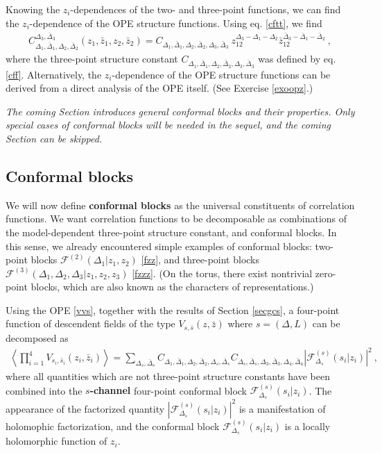 \documentclass[12pt,a4paper,notitlepage]{report}
\numberwithin{equation}{section}
\theoremstyle{break}
\begin{document}
Knowing the $z_i$-dependences of the two- and three-point functions, we can find the $z_i$-dependence of the OPE structure functions.
Using eq. \eqref{cftt}, we find 
\begin{align}
 \boxed{C_{\Delta_1,\bar{\Delta}_1,\Delta_2,\bar{\Delta}_2}^{\Delta_3,\bar{\Delta}_3}(z_1,\bar{z}_1,z_2,\bar{z}_2) = C_{\Delta_1,\bar{\Delta}_1,\Delta_2,\bar{\Delta}_2,\Delta_3,\bar{\Delta}_3}\ z_{12}^{\Delta_3-\Delta_1-\Delta_2}  \bar{z}_{12}^{\bar{\Delta}_3-\bar{\Delta}_1-\bar{\Delta}_2}}\ ,
\label{ccz}
\end{align}
where the three-point structure constant $C_{\Delta_1,\bar{\Delta}_1,\Delta_2,\bar{\Delta}_2,\Delta_3,\bar{\Delta}_3}$ was defined by eq. \eqref{cff}.
Alternatively, the $z_i$-dependence of the OPE structure functions can be derived from a direct analysis of the OPE itself. (See Exercise \ref{exoopz}.)

\vspace{2mm} 

\textit{The coming Section introduces general conformal blocks and their properties.
Only special cases of conformal blocks will be needed in the sequel, and the coming Section can be skipped.}

\subsection{Conformal blocks \label{secaco}}

We will now define \textbf{\boldmath conformal blocks} as the universal constituents of correlation functions. 
We want correlation functions to be decomposable as combinations of the model-dependent three-point structure constant, and conformal blocks.
In this sense, we already encountered simple examples of conformal blocks: two-point blocks $\mathcal{F}^{(2)}(\Delta_1|z_1,z_2)$ \eqref{fzz}, and three-point blocks $\mathcal{F}^{(3)}(\Delta_1,\Delta_2,\Delta_3|z_1,z_2,z_3)$ \eqref{fzzz}. (On the torus, there exist nontrivial zero-point blocks, which are also known as the characters of representations.)

Using the OPE \eqref{vvs}, together with the results of Section \ref{secgcs}, a four-point function of descendent fields of the type $V_{s,\bar{s}}(z,\bar{z})$ where $s=(\Delta,L)$ can be decomposed as 
\begin{align}
 \left\langle \prod_{i=1}^4 V_{s_i,\bar{s}_i}(z_i,\bar{z}_i)\right\rangle = \sum_{\Delta_s,\bar{\Delta}_s} C_{\Delta_1,\bar{\Delta}_1,\Delta_2,\bar{\Delta}_2,\Delta_s,\bar{\Delta}_s} C_{\Delta_s,\bar{\Delta}_s,\Delta_3,\bar{\Delta}_3,\Delta_4,\bar{\Delta}_4} \left| \mathcal{F}^{(s)}_{\Delta_s}(s_i|z_i)\right|^2\ ,
\label{fsd}
\end{align}
where all quantities which are not three-point structure constants have been combined into the \textbf{\boldmath $s$-channel} four-point conformal block $\mathcal{F}^{(s)}_{\Delta_s}(s_i|z_i)$.
The appearance of the factorized quantity $\left| \mathcal{F}^{(s)}_{\Delta_s}(s_i|z_i)\right|^2$ is a manifestation of holomophic factorization, and the conformal block $\mathcal{F}^{(s)}_{\Delta_s}(s_i|z_i)$ is a locally holomorphic function of $z_i$. 
\end{document}
